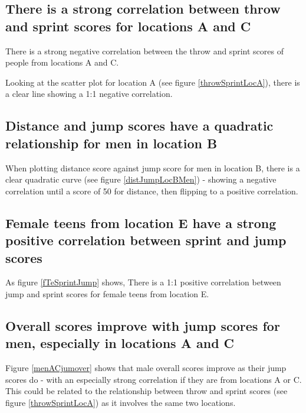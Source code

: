 \documentclass[runningheads]{llncs}
\begin{document}
\subsection{There is a strong correlation between throw and sprint scores for locations A and C}
There is a strong negative correlation between the throw and sprint scores of people from locations A and C.

Looking at the scatter plot for location A (see figure \ref{throwSprintLocA}), there is a clear line showing a 1:1 negative correlation.

\subsection{Distance and jump scores have a quadratic relationship for men in location B}

When plotting distance score against jump score for men in location B, there is a clear quadratic curve (see figure \ref{distJumpLocBMen}) - showing a negative correlation until a score of 50 for distance, then flipping to a positive correlation.

\subsection{Female teens from location E have a strong positive correlation between sprint and jump scores}
As figure \ref{fTeSprintJump} shows, There is a 1:1 positive correlation between jump and sprint scores for female teens from location E.

\subsection{Overall scores improve with jump scores for men, especially in locations A and C}
Figure \ref{menACjumover} shows that male overall scores improve as their jump scores do - with an especially strong correlation if they are from locations A or C. This could be related to the relationship between throw and sprint scores (see figure \ref{throwSprintLocA}) as it involves the same two locations.


\end{document}
